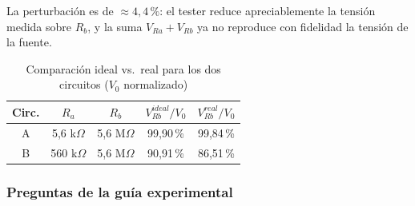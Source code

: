 La perturbación es de ${\approx}4{,}4\,\%$: el tester reduce apreciablemente
la tensión medida sobre $R_b$, y la suma $V_{Ra} + V_{Rb}$ ya no reproduce
con fidelidad la tensión de la fuente.
 
\begin{table}[H]
    \centering
    \caption{Comparación ideal vs.\ real para los dos circuitos ($V_0$ normalizado)}
    \label{tab:divisor-comparacion}
    \begin{tabular}{|c|c|c|c|c|}
        \hline
        \textbf{Circ.} & $R_a$ & $R_b$
            & $V_{Rb}^{ideal}/V_0$ & $V_{Rb}^{real}/V_0$ \\ \hline
        A & 5{,}6 k$\Omega$ & 5{,}6 M$\Omega$ & 99{,}90\,\% & 99{,}84\,\% \\ \hline
        B & 560 k$\Omega$   & 5{,}6 M$\Omega$ & 90{,}91\,\% & 86{,}51\,\% \\ \hline
    \end{tabular}
\end{table}
 
 

\clearpage
\subsubsection{Preguntas de la guía experimental}
\label{subsubsec:preguntas-guia}


